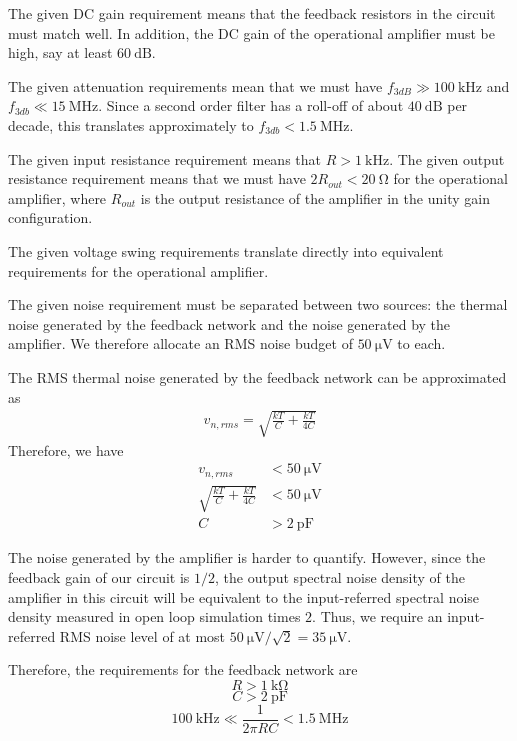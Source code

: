 \documentclass[journal,hidelinks]{IEEEtran}
\begin{document}
The given DC gain requirement means that the feedback resistors in the circuit must match well. In addition, the DC gain of the operational amplifier must be high, say at least $\SI{60}{\deci\bel}$.

The given attenuation requirements mean that we must have $f_{3dB} \gg \SI{100}{\kilo\hertz}$ and $f_{3db} \ll \SI{15}{\mega\hertz}$. Since a second order filter has a roll-off of about $\SI{40}{\deci\bel}$ per decade, this translates approximately to $f_{3db} < \SI{1.5}{\mega\hertz}$.

The given input resistance requirement means that $R > \SI{1}{\kilo\hertz}$. The given output resistance requirement means that we must have $2 R_{out} < \SI{20}{\ohm}$ for the operational amplifier, where $R_{out}$ is the output resistance of the amplifier in the unity gain configuration.

The given voltage swing requirements translate directly into equivalent requirements for the operational amplifier.

The given noise requirement must be separated between two sources: the thermal noise generated by the feedback network and the noise generated by the amplifier. We therefore allocate an RMS noise budget of $\SI{50}{\micro\volt}$ to each.

The RMS thermal noise generated by the feedback network can be approximated as
\begin{align}
v_{n,rms} = \sqrt{\frac{kT}{C} + \frac{kT}{4C}}
\end{align}
Therefore, we have
\begin{align}
v_{n,rms} &< \SI{50}{\micro\volt} \\
\sqrt{\frac{kT}{C} + \frac{kT}{4C}} &< \SI{50}{\micro\volt} \\
C &> \SI{2}{\pico\farad}
\end{align}

The noise generated by the amplifier is harder to quantify. However, since the feedback gain of our circuit is $1 / 2$, the output spectral noise density of the amplifier in this circuit will be equivalent to the input-referred spectral noise density measured in open loop simulation times $2$. Thus, we require an input-referred RMS noise level of at most $\SI{50}{\micro\volt} / \sqrt{2} = \SI{35}{\micro\volt}$.

Therefore, the requirements for the feedback network are
\begin{equation}
R > \SI{1}{\kilo\ohm}
\end{equation}
\begin{equation}
C > \SI{2}{\pico\farad}
\end{equation}
\begin{equation}
\SI{100}{\kilo\hertz} \ll \frac{1}{2 \pi R C} < \SI{1.5}{\mega\hertz}
\end{equation}
\end{document}

